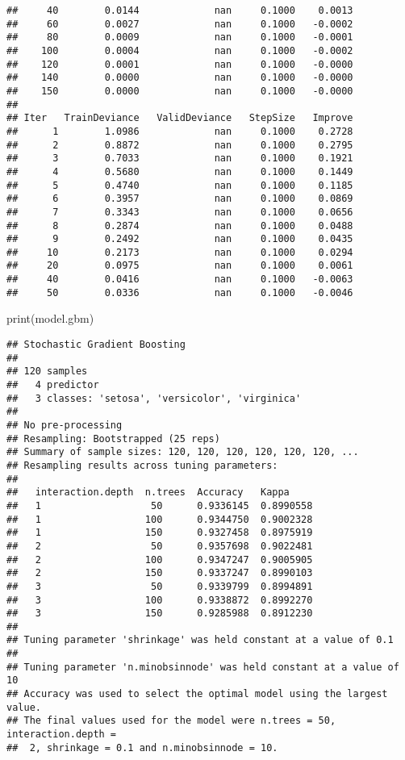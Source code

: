 \documentclass[
]{article}
\newenvironment{Shaded}{\begin{snugshade}}{\end{snugshade}}
\newcommand{\FunctionTok}[1]{\textcolor[rgb]{0.00,0.00,0.00}{#1}}
\newcommand{\NormalTok}[1]{#1}
\begin{document}
\begin{verbatim}
##     40        0.0144             nan     0.1000    0.0013
##     60        0.0027             nan     0.1000   -0.0002
##     80        0.0009             nan     0.1000   -0.0001
##    100        0.0004             nan     0.1000   -0.0002
##    120        0.0001             nan     0.1000   -0.0000
##    140        0.0000             nan     0.1000   -0.0000
##    150        0.0000             nan     0.1000   -0.0000
## 
## Iter   TrainDeviance   ValidDeviance   StepSize   Improve
##      1        1.0986             nan     0.1000    0.2728
##      2        0.8872             nan     0.1000    0.2795
##      3        0.7033             nan     0.1000    0.1921
##      4        0.5680             nan     0.1000    0.1449
##      5        0.4740             nan     0.1000    0.1185
##      6        0.3957             nan     0.1000    0.0869
##      7        0.3343             nan     0.1000    0.0656
##      8        0.2874             nan     0.1000    0.0488
##      9        0.2492             nan     0.1000    0.0435
##     10        0.2173             nan     0.1000    0.0294
##     20        0.0975             nan     0.1000    0.0061
##     40        0.0416             nan     0.1000   -0.0063
##     50        0.0336             nan     0.1000   -0.0046
\end{verbatim}

\begin{Shaded}
\begin{Highlighting}[]
\FunctionTok{print}\NormalTok{(model.gbm)}
\end{Highlighting}
\end{Shaded}

\begin{verbatim}
## Stochastic Gradient Boosting 
## 
## 120 samples
##   4 predictor
##   3 classes: 'setosa', 'versicolor', 'virginica' 
## 
## No pre-processing
## Resampling: Bootstrapped (25 reps) 
## Summary of sample sizes: 120, 120, 120, 120, 120, 120, ... 
## Resampling results across tuning parameters:
## 
##   interaction.depth  n.trees  Accuracy   Kappa    
##   1                   50      0.9336145  0.8990558
##   1                  100      0.9344750  0.9002328
##   1                  150      0.9327458  0.8975919
##   2                   50      0.9357698  0.9022481
##   2                  100      0.9347247  0.9005905
##   2                  150      0.9337247  0.8990103
##   3                   50      0.9339799  0.8994891
##   3                  100      0.9338872  0.8992270
##   3                  150      0.9285988  0.8912230
## 
## Tuning parameter 'shrinkage' was held constant at a value of 0.1
## 
## Tuning parameter 'n.minobsinnode' was held constant at a value of 10
## Accuracy was used to select the optimal model using the largest value.
## The final values used for the model were n.trees = 50, interaction.depth =
##  2, shrinkage = 0.1 and n.minobsinnode = 10.
\end{verbatim}
\end{document}

